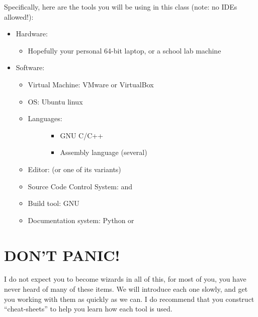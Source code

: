 \documentclass[letterpaper,11pt,english]{sphinxmanual}
\begin{document}
Specifically, here are the tools you will be using in this class (note: no IDEs
allowed!):
\begin{itemize}
\item {} 
Hardware:
\begin{itemize}
\item {} 
Hopefully your personal 64-bit laptop, or a school lab machine

\end{itemize}

\item {} 
Software:
\begin{itemize}
\item {} 
Virtual Machine: VMware or VirtualBox

\item {} 
OS: Ubuntu linux

\item {} \begin{description}
\item[{Languages:}] \leavevmode\begin{itemize}
\item {} 
GNU C/C++

\item {} 
Assembly language (several)

\end{itemize}

\end{description}

\item {} 
Editor:  (or one of its variants)

\item {} 
Source Code Control System:  and 

\item {} 
Build tool: GNU 

\item {} 
Documentation system: Python  or 

\end{itemize}

\end{itemize}


\section{DON’T PANIC!}
\label{\detokenize{01_introduction/are-you-ready-to-code:don-t-panic}}
I do not expect you to become wizards in all of this, for most of you, you have
never heard of many of these items. We will introduce each one slowly, and get
you working with them as quickly as we can. I do recommend that you construct
“cheat-sheets” to help you learn how each tool is used.
\end{document}
